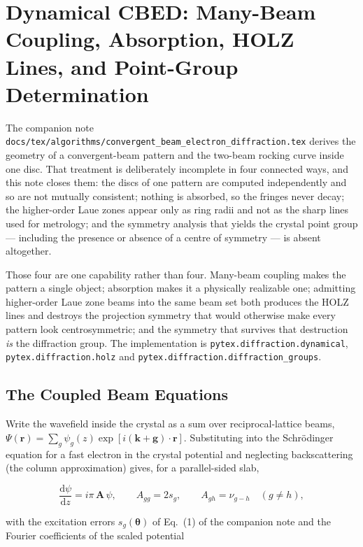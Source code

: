 \section{Dynamical CBED: Many-Beam Coupling, Absorption, HOLZ Lines, and Point-Group
Determination}

The companion note \texttt{docs/tex/algorithms/convergent\_beam\_electron\_diffraction.tex}
derives the geometry of a convergent-beam pattern and the two-beam rocking curve inside one
disc. That treatment is deliberately incomplete in four connected ways, and this note closes
them: the discs of one pattern are computed independently and so are not mutually consistent;
nothing is absorbed, so the fringes never decay; the higher-order Laue zones appear only as
ring radii and not as the sharp lines used for metrology; and the symmetry analysis that
yields the crystal point group --- including the presence or absence of a centre of
symmetry --- is absent altogether.

Those four are one capability rather than four. Many-beam coupling makes the pattern a
single object; absorption makes it a physically realizable one; admitting higher-order Laue
zone beams into the same beam set both produces the HOLZ lines and destroys the projection
symmetry that would otherwise make every pattern look centrosymmetric; and the symmetry that
survives that destruction \emph{is} the diffraction group. The implementation is
\texttt{pytex.diffraction.dynamical}, \texttt{pytex.diffraction.holz} and
\texttt{pytex.diffraction.diffraction\_groups}.

\subsection{The Coupled Beam Equations}

Write the wavefield inside the crystal as a sum over reciprocal-lattice beams,
\(\Psi(\mathbf{r}) = \sum_{g}\psi_{g}(z)\exp[i(\mathbf{k}+\mathbf{g})\cdot\mathbf{r}]\).
Substituting into the Schr\"odinger equation for a fast electron in the crystal potential and
neglecting backscattering (the column approximation) gives, for a parallel-sided slab,

\begin{equation}
  \frac{\mathrm{d}\psi}{\mathrm{d}z} = i\pi\,\mathbf{A}\,\psi,
  \qquad
  A_{gg} = 2 s_{g},
  \qquad
  A_{gh} = \nu_{g-h} \quad (g \neq h),
  \label{eq:dyn-system}
\end{equation}

with the excitation errors \(s_{g}(\boldsymbol{\theta})\) of Eq.~(1) of the companion note
and the Fourier coefficients of the scaled potential

